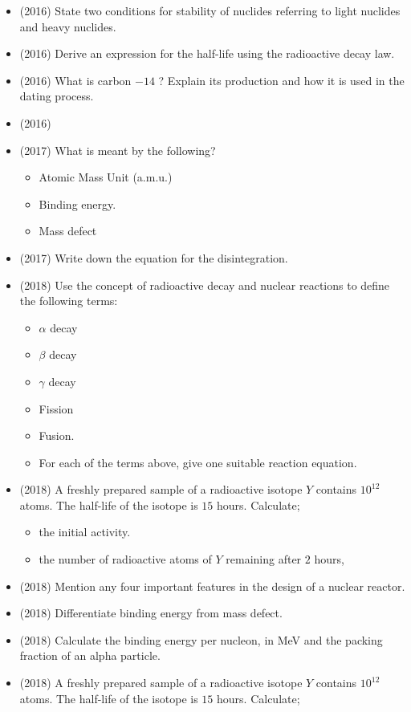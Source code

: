 \documentclass{article}
\begin{document}
\begin{itemize}
\item (2016)  State two conditions for stability of nuclides referring to light nuclides and heavy nuclides.
\item (2016)  Derive an expression for the half-life using the radioactive decay law.
\item (2016)  What is carbon $ -14$ ?  Explain its production and how it is used in the dating process.
\item (2016)  \item (2017)  What is meant by the following?\begin{itemize}
\item Atomic Mass Unit (a.m.u.)
\item Binding energy. 
\item Mass defect
\end{itemize}
\item (2017)  Write down the equation for the disintegration.
\item (2018)  Use the concept of radioactive decay and nuclear reactions to define the following terms:\begin{itemize}
\item $ \alpha $ decay
\item $ \beta$ decay
\item $ \gamma $ decay
\item Fission
\item Fusion.
\item For each of the terms above, give one suitable reaction equation. 
\end{itemize}
\item (2018)  A freshly prepared sample of a radioactive isotope $ Y$ contains $ 10^{12}$ atoms. The half-life of the isotope is $ 15$ hours. Calculate;\begin{itemize}
\item the initial activity. 
\item the number of radioactive atoms of $ Y$ remaining after $ 2$ hours, 
\end{itemize}
\item (2018)  Mention any four important features in the design of a nuclear reactor.
\item (2018)  Differentiate binding energy from mass defect.
\item (2018)  Calculate the binding energy per nucleon, in MeV and the packing fraction of an alpha particle.
\item (2018)  A freshly prepared sample of a radioactive isotope $ Y$ contains $ 10^{12}$ atoms. The half-life of the isotope is $ 15$ hours. Calculate;\begin{itemize}

\end{itemize}
\end{itemize}
\end{document}

